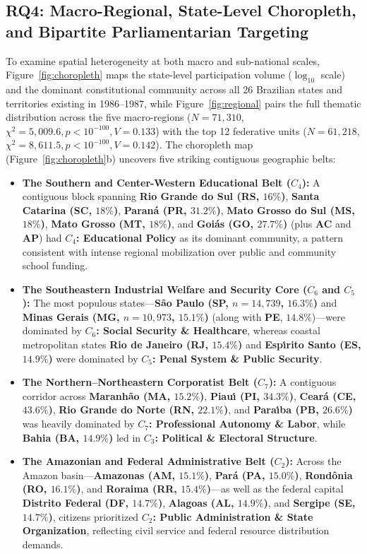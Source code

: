 \documentclass[pdflatex,sn-mathphys,iicol]{sn-jnl}
\begin{document}
\subsection{RQ4: Macro-Regional, State-Level Choropleth, and Bipartite Parliamentarian Targeting}
To examine spatial heterogeneity at both macro and sub-national scales, Figure~\ref{fig:choropleth} maps the state-level participation volume ($\log_{10}$ scale) and the dominant constitutional community across all 26 Brazilian states and territories existing in 1986--1987, while Figure~\ref{fig:regional} pairs the full thematic distribution across the five macro-regions ($N=71,310$, $\chi^2 = 5,009.6, p < 10^{-100}, V = 0.133$) with the top 12 federative units ($N=61,218$, $\chi^2 = 8,611.5, p < 10^{-100}, V = 0.142$). The choropleth map (Figure~\ref{fig:choropleth}b) uncovers five striking contiguous geographic belts:
\begin{itemize}
    \item \textbf{The Southern and Center-Western Educational Belt ($C_4$):} A contiguous block spanning \textbf{Rio Grande do Sul (RS, $16\%$)}, \textbf{Santa Catarina (SC, $18\%$)}, \textbf{Paran\'{a} (PR, $31.2\%$)}, \textbf{Mato Grosso do Sul (MS, $18\%$)}, \textbf{Mato Grosso (MT, $18\%$)}, and \textbf{Goi\'{a}s (GO, $27.7\%$)} (plus \textbf{AC} and \textbf{AP}) had \textbf{$C_4$: Educational Policy} as its dominant community, a pattern consistent with intense regional mobilization over public and community school funding.
    \item \textbf{The Southeastern Industrial Welfare and Security Core ($C_6$ and $C_5$):} The most populous states---\textbf{S\~{a}o Paulo (SP, $n=14,739$, $16.3\%$)} and \textbf{Minas Gerais (MG, $n=10,973$, $15.1\%$)} (along with \textbf{PE}, $14.8\%$)---were dominated by \textbf{$C_6$: Social Security \& Healthcare}, whereas coastal metropolitan states \textbf{Rio de Janeiro (RJ, $15.4\%$)} and \textbf{Esp\'{\i}rito Santo (ES, $14.9\%$)} were dominated by \textbf{$C_5$: Penal System \& Public Security}.
    \item \textbf{The Northern--Northeastern Corporatist Belt ($C_7$):} A contiguous corridor across \textbf{Maranh\~{a}o (MA, $15.2\%$)}, \textbf{Piau\'{\i} (PI, $34.3\%$)}, \textbf{Cear\'{a} (CE, $43.6\%$)}, \textbf{Rio Grande do Norte (RN, $22.1\%$)}, and \textbf{Para\'{\i}ba (PB, $26.6\%$)} was heavily dominated by \textbf{$C_7$: Professional Autonomy \& Labor}, while \textbf{Bahia (BA, $14.9\%$)} led in \textbf{$C_3$: Political \& Electoral Structure}.
    \item \textbf{The Amazonian and Federal Administrative Belt ($C_2$):} Across the Amazon basin---\textbf{Amazonas (AM, $15.1\%$)}, \textbf{Par\'{a} (PA, $15.0\%$)}, \textbf{Rond\^{o}nia (RO, $16.1\%$)}, and \textbf{Roraima (RR, $15.4\%$)}---as well as the federal capital \textbf{Distrito Federal (DF, $14.7\%$)}, \textbf{Alagoas (AL, $14.9\%$)}, and \textbf{Sergipe (SE, $14.7\%$)}, citizens prioritized \textbf{$C_2$: Public Administration \& State Organization}, reflecting civil service and federal resource distribution demands.
\end{itemize}
\end{document}
